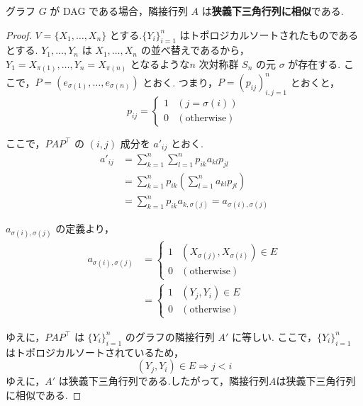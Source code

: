 \documentclass[uplatex, dvipdfmx]{jsarticle}
\begin{document}
\begin{thm}{}
  グラフ $G$ が DAG である場合，隣接行列 $A$ は\textbf{狭義下三角行列に相似}である.
\end{thm}

\begin{proof}
  $V = \{X_1, \dots, X_n\}$ とする.$\{Y_i\}_{i=1}^n$ はトポロジカルソートされたものであるとする.
  $Y_1, \dots, Y_n$ は $X_1, \dots, X_n$ の並べ替えであるから，$Y_1 = X_{\pi(1)}, \dots, Y_n = X_{\pi(n)}$ となるような$n$ 次対称群 $S_n$ の元 $\sigma$ が存在する.
  ここで，$P = (e_{\sigma(1)}, \dots, e_{\sigma(n)})$ とおく.
  つまり，$P = (p_{ij})_{i,j=1}^n$ とおくと，
  \begin{equation}
    p_{ij} = 
    \begin{cases} 
      1 & (j = \sigma(i)) \\
      0 & (\text{otherwise})
    \end{cases}
  \end{equation}

  ここで，$PAP^\top$ の $(i, j)$ 成分を $a'_{ij}$ とおく.
  \begin{align}
    a'_{ij} &= \sum_{k=1}^n \sum_{l=1}^n p_{ik} a_{kl} p_{jl} \\
    &= \sum_{k=1}^n p_{ik} \left( \sum_{l=1}^n a_{kl} p_{jl} \right) \\
    &= \sum_{k=1}^n p_{ik} a_{k, \sigma(j)} = a_{\sigma(i), \sigma(j)}
  \end{align}

  $a_{\sigma(i), \sigma(j)}$ の定義より，
  \begin{align}
    a_{\sigma(i), \sigma(j)} &= 
    \begin{cases} 
      1 & (X_{\sigma(j)}, X_{\sigma(i)}) \in E \\
      0 & (\text{otherwise})
    \end{cases} \\
    &= 
    \begin{cases} 
      1 & (Y_j, Y_i) \in E \\
      0 & (\text{otherwise})
    \end{cases}
  \end{align}

  ゆえに，$PAP^\top$ は $\{Y_i\}_{i=1}^n$ のグラフの隣接行列 $A'$ に等しい.
  ここで，$\{Y_i\}_{i=1}^n$ はトポロジカルソートされているため，
  \begin{equation}
    (Y_j, Y_i) \in E \Rightarrow j < i
  \end{equation}
  ゆえに，$A'$ は狭義下三角行列である.したがって，隣接行列$A$は狭義下三角行列に相似である.
\end{proof}
\end{document}
